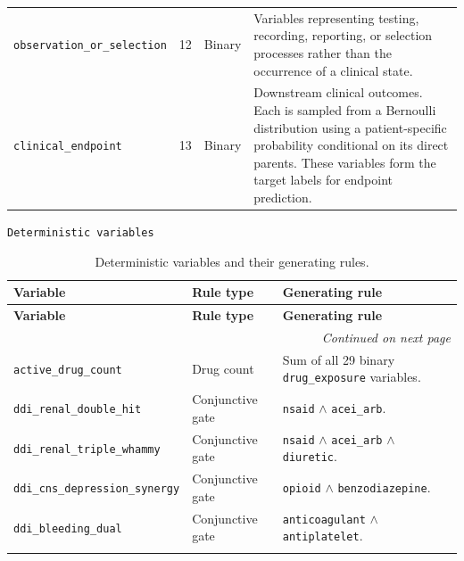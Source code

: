 \begin{longtable}{@{}p{}p{}p{}p{}@{}}
\texttt{observation\_or\_selection} & 12 & Binary & Variables representing testing, recording, reporting, or selection processes rather than the occurrence of a clinical state. \\
\addlinespace

\texttt{clinical\_endpoint} & 13 & Binary & Downstream clinical outcomes. Each is sampled from a Bernoulli distribution using a patient-specific probability conditional on its direct parents. These variables form the target labels for endpoint prediction. \\
\end{longtable}



\texttt{Deterministic variables}

\begin{longtable}{@{}p{}p{}p{}@{}}
\caption{Deterministic variables and their generating rules.}
\label{tab:app_deterministic_variables} \\
\toprule
\textbf{Variable} & \textbf{Rule type} & \textbf{Generating rule} \\
\midrule
\endfirsthead

\toprule
\textbf{Variable} & \textbf{Rule type} & \textbf{Generating rule} \\
\midrule
\endhead

\bottomrule
\multicolumn{3}{r}{\emph{Continued on next page}} \\
\endfoot

\bottomrule
\endlastfoot

\texttt{active\_drug\_count} & Drug count & Sum of all 29 binary \texttt{drug\_exposure} variables. \\
\addlinespace

\texttt{ddi\_renal\_double\_hit} & Conjunctive gate & \texttt{nsaid} $\land$ \texttt{acei\_arb}. \\
\addlinespace

\texttt{ddi\_renal\_triple\_whammy} & Conjunctive gate & \texttt{nsaid} $\land$ \texttt{acei\_arb} $\land$ \texttt{diuretic}. \\
\addlinespace

\texttt{ddi\_cns\_depression\_synergy} & Conjunctive gate & \texttt{opioid} $\land$ \texttt{benzodiazepine}. \\
\addlinespace

\texttt{ddi\_bleeding\_dual} & Conjunctive gate & \texttt{anticoagulant} $\land$ \texttt{antiplatelet}. \\
\addlinespace


\end{longtable}
